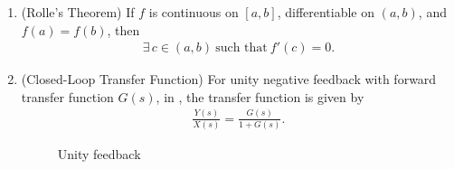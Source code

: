 \begin{enumerate}[label=\thesubsection.\arabic*,ref=\thesubsection.\theenumi]

\item (Rolle's Theorem)
	\label{prop:rolle}
If $f$ is continuous on $[a,b]$, differentiable on $(a,b)$, and
$f(a)=f(b)$, then
\begin{align}
\exists\, c\in(a,b)\ \text{such that}\ f'(c)=0.
	\label{eq:EE26BTECH11221-rolle}
\end{align}
\item (Closed-Loop Transfer Function)
For unity negative feedback with forward transfer function $G(s)$,
  in ,
the transfer function is given by 
\begin{align}
\frac{Y(s)}{X(s)}=\frac{G(s)}{1+G(s)}. 
\label{eq:EE26BTECH11221-neg}
\end{align}
	\begin{figure}[H]
  \centering
  \resizebox{0.75\columnwidth}{!}{%
	  
  }
  \caption{Unity feedback}
  \label{fig:EE26BTECH11221-unity-feedback}
\end{figure}


\end{enumerate}

